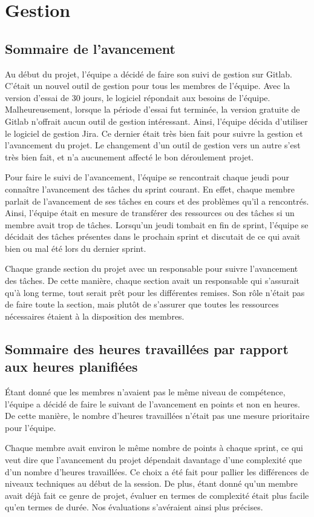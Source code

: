 \section{Gestion}
    \subsection{Sommaire de l'avancement}
    Au début du projet, l'équipe a décidé de faire son suivi de gestion sur Gitlab. C'était un nouvel outil de gestion pour tous les membres de l'équipe. Avec la version d'essai de 30 jours, le logiciel répondait aux besoins de l'équipe. Malheureusement, lorsque la période d'essai fut terminée, la version gratuite de Gitlab n'offrait aucun outil de gestion intéressant. Ainsi, l'équipe décida d'utiliser le logiciel de gestion Jira. Ce dernier était très bien fait pour suivre la gestion et l'avancement du projet. Le changement d'un outil de gestion vers un autre s'est très bien fait, et n'a aucunement affecté le bon déroulement projet.

    Pour faire le suivi de l'avancement, l'équipe se rencontrait chaque jeudi pour connaître l'avancement des tâches du sprint courant. En effet, chaque membre parlait de l'avancement de ses tâches en cours et des problèmes qu'il a rencontrés. Ainsi, l'équipe était en mesure de transférer des ressources ou des tâches si un membre avait trop de tâches. Lorsqu'un jeudi tombait en fin de sprint, l'équipe se décidait des tâches présentes dans le prochain sprint et discutait de ce qui avait bien ou mal été lors du dernier sprint.
    
    Chaque grande section du projet avec un responsable pour suivre l'avancement des tâches. De cette manière, chaque section avait un responsable qui s'assurait qu'à long terme, tout serait prêt pour les différentes remises. Son rôle n'était pas de faire toute la section, mais plutôt de s'assurer que toutes les ressources nécessaires étaient à la disposition des membres.

    \subsection{Sommaire des heures travaillées par rapport aux heures planifiées}
    Étant donné que les membres n'avaient pas le même niveau de compétence, l'équipe a décidé de faire le suivant de l'avancement en points et non en heures. De cette manière, le nombre d'heures travaillées n'était pas une mesure prioritaire pour l'équipe.

    Chaque membre avait environ le même nombre de points à chaque sprint, ce qui veut dire que l'avancement du projet dépendait davantage d'une complexité que d'un nombre d'heures travaillées. Ce choix a été fait pour pallier les différences de niveaux techniques au début de la session. De plus, étant donné qu'un membre avait déjà fait ce genre de projet, évaluer en termes de complexité était plus facile qu'en termes de durée. Nos évaluations s'avéraient ainsi plus précises.

